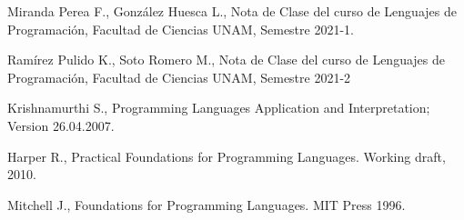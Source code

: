 \documentclass[12pt]{extarticle}
\begin{document}

\begin{thebibliography}{9}

Miranda Perea F., González Huesca L., Nota de Clase del curso de Lenguajes de Programación, Facultad de Ciencias UNAM, Semestre 2021-1.

Ramírez Pulido K., Soto Romero M., Nota de Clase del curso de Lenguajes de Programación, Facultad de Ciencias UNAM, Semestre 2021-2

Krishnamurthi S., Programming Languages Application and Interpretation; Version 26.04.2007.

Harper R., Practical Foundations for Programming Languages. Working draft, 2010.

Mitchell J., Foundations for Programming Languages. MIT Press 1996.



\end{thebibliography}
\end{document}
